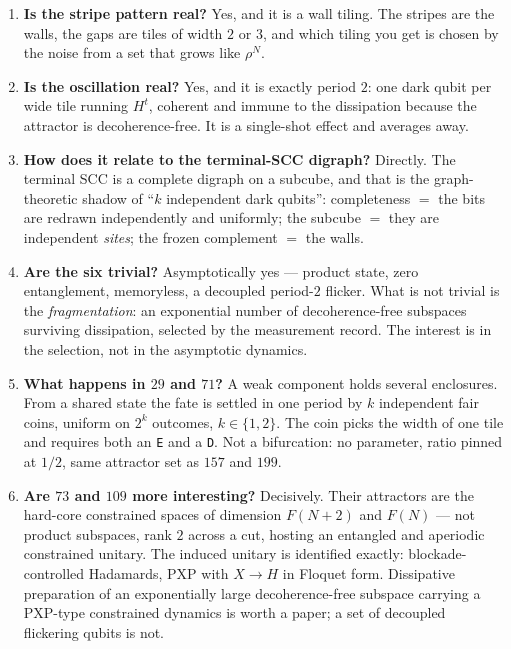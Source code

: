 \documentclass[11pt]{article}
\newcommand{\rt}[1]{\texttt{#1}}
\theoremstyle{plain}
\begin{document}
\begin{enumerate}
\item \textbf{Is the stripe pattern real?} Yes, and it is a wall tiling. The
stripes are the walls, the gaps are tiles of width $2$ or $3$, and which tiling
you get is chosen by the noise from a set that grows like $\rho^N$.

\item \textbf{Is the oscillation real?} Yes, and it is exactly period $2$: one
dark qubit per wide tile running $H^t$, coherent and immune to the dissipation
because the attractor is decoherence-free. It is a single-shot effect and
averages away.

\item \textbf{How does it relate to the terminal-SCC digraph?} Directly. The
terminal SCC is a complete digraph on a subcube, and that is the graph-theoretic
shadow of ``$k$ independent dark qubits'': completeness $=$ the bits are
redrawn independently and uniformly; the subcube $=$ they are independent
\emph{sites}; the frozen complement $=$ the walls.

\item \textbf{Are the six trivial?} Asymptotically yes --- product state, zero
entanglement, memoryless, a decoupled period-$2$ flicker. What is not trivial is
the \emph{fragmentation}: an exponential number of decoherence-free subspaces
surviving dissipation, selected by the measurement record. The interest is in the
selection, not in the asymptotic dynamics.

\item \textbf{What happens in $29$ and $71$?} A weak component holds several
enclosures. From a shared state the fate is settled in one period by $k$
independent fair coins, uniform on $2^k$ outcomes, $k\in\{1,2\}$. The coin picks
the width of one tile and requires both an \rt{E} and a \rt{D}. Not a
bifurcation: no parameter, ratio pinned at $1/2$, same attractor set as $157$ and
$199$.

\item \textbf{Are $73$ and $109$ more interesting?} Decisively. Their attractors
are the hard-core constrained spaces of dimension $F(N+2)$ and $F(N)$ --- not
product subspaces, rank $2$ across a cut, hosting an entangled and aperiodic
constrained unitary. The induced unitary is
identified exactly: blockade-controlled Hadamards, PXP with $X\to H$ in Floquet
form. Dissipative preparation of an exponentially large decoherence-free
subspace carrying a PXP-type constrained dynamics is worth a paper; a set of
decoupled flickering qubits is not.
\end{enumerate}
\end{document}
